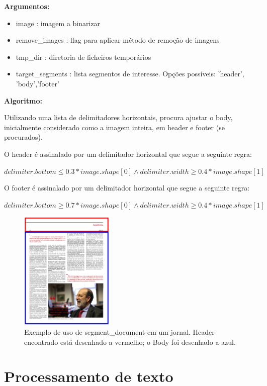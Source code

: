 \textbf{Argumentos:}
\begin{itemize}\setlength\itemsep{-0.3em}
	\item image : imagem a binarizar
	\item remove\_images : flag para aplicar método de remoção de imagens
	\item tmp\_dir : diretoria de ficheiros temporários
	\item target\_segments : lista segmentos de interesse. Opções possíveis: 'header', 'body','footer'
\end{itemize}

\textbf{Algoritmo:} 

Utilizando uma lista de delimitadores horizontais, procura ajustar o body, inicialmente considerado como a imagem inteira, em header e footer (se procurados). 

O header é assinalado por um delimitador horizontal que segue a seguinte regra:

$delimiter.bottom \leq 0.3*image.shape[0] \wedge delimiter.width \geq 0.4*image.shape[1]$

O footer é assinalado por um delimitador horizontal que segue a seguinte regra:

$delimiter.bottom \geq 0.7*image.shape[0] \wedge delimiter.width \geq 0.4*image.shape[1]$


\begin{figure}[H]
	\centering
	\includegraphics[width=0.4\textwidth]{images/ilustracoes/segment_document_example.png}
	\caption{Exemplo de uso de segment\_document em um jornal. Header encontrado está desenhado a vermelho; o Body foi desenhado a azul.}
	\label{fig:segment_document_example}
\end{figure}



\section{Processamento de texto}
\label{contribution_text_processing}


